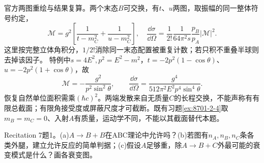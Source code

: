 \begin{solution}
官方两图重绘与结果复算。两个末态$B$可交换，有$t$、$u$两图，取振幅的同一整体符号约定，
\begin{equation}
 \mathcal M=g^2\left[\frac1{t-m_C^2}+\frac1{u-m_C^2}\right],\quad
 \frac{\dd\sigma}{\dd\Omega}=\frac1{2!}\frac1{64\pi^2s}\frac{p_B}{p_A}|\mathcal M|^2.
\end{equation}
这里按完整立体角积分，$1/2!$消除同一末态配置被重复计数；若只积不重叠半球则去掉该因子。
特例中$s=4E^2,p^2=E^2-m^2$，$t=-2p^2(1-\cos\theta)$、$u=-2p^2(1+\cos\theta)$，故
\begin{equation}
 \mathcal M=-\frac{g^2}{p^2\sin^2\theta},\qquad
 \frac{\dd\sigma}{\dd\Omega}=\frac{g^4}{512\pi^2E^2p^4\sin^4\theta}.
\end{equation}
恢复自然单位面积需乘$(\hbar c)^2$。两端发散来自无质量$C$的长程交换，不能声称有有限总截面；有限角接受度或屏蔽尺度才可截断。既有习题\ref{ex:8701-2-4}取$m_B=m_C=0$、入射$A$有质量，运动学不同，不能以其截面替代本题。
\begin{center}\end{center}
\end{solution}
\begin{exercise}\label{ex:rec-7-1}
Recitation 7题1。(a)$A\to B+B$在ABC理论中允许吗？(b)若图有$n_A,n_B,n_C$条各类外腿，建立允许反应的简单判据；(c)假设$A$足够重，除$A\to B+C$外最可能的衰变模式是什么？画各衰变图。
\end{exercise}
